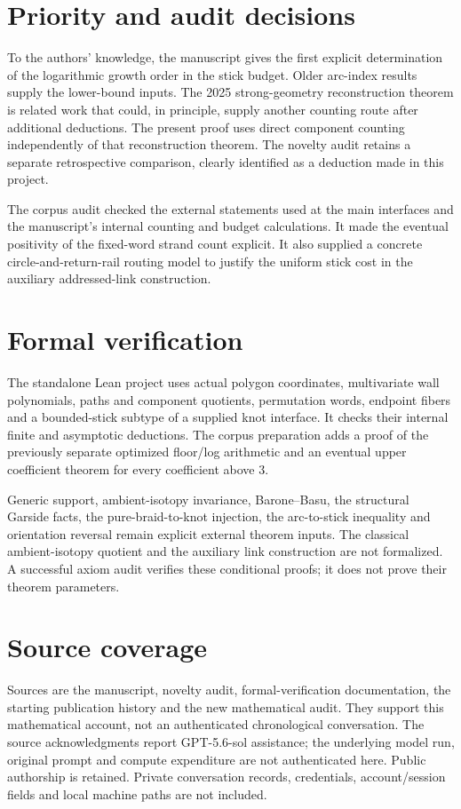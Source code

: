 \documentclass[11pt]{article}
\begin{document}
\section*{Priority and audit decisions}
To the authors' knowledge, the manuscript gives the first explicit
determination of the logarithmic growth order in the stick budget. Older
arc-index results supply the lower-bound inputs. The 2025 strong-geometry
reconstruction theorem is related work that could, in principle, supply
another counting route after additional deductions. The present proof uses
direct component counting independently of that reconstruction theorem.
The novelty audit retains a separate retrospective comparison, clearly
identified as a deduction made in this project.

The corpus audit checked the external statements used at the main interfaces
and the manuscript's internal counting and budget calculations. It made the
eventual positivity of the fixed-word strand count explicit. It also supplied
a concrete circle-and-return-rail routing model to justify the uniform stick
cost in the auxiliary addressed-link construction.

\section*{Formal verification}
The standalone Lean project uses actual polygon coordinates, multivariate
wall polynomials, paths and component quotients, permutation words, endpoint
fibers and a bounded-stick subtype of a supplied knot interface. It checks
their internal finite and asymptotic deductions. The corpus preparation adds
a proof of the previously separate optimized floor/log arithmetic and an
eventual upper coefficient theorem for every coefficient above 3.

Generic support, ambient-isotopy invariance, Barone--Basu, the structural
Garside facts, the pure-braid-to-knot injection, the arc-to-stick inequality
and orientation reversal remain explicit external theorem inputs. The
classical ambient-isotopy quotient and the auxiliary link construction are
not formalized. A successful axiom audit verifies these conditional proofs;
it does not prove their theorem parameters.

\section*{Source coverage}
Sources are the manuscript, novelty audit, formal-verification documentation,
the starting publication history and the new mathematical audit. They support
this mathematical account, not an authenticated chronological conversation.
The source acknowledgments report GPT-5.6-sol assistance; the underlying
model run, original prompt and compute expenditure are not authenticated here.
Public authorship is retained. Private conversation records, credentials,
account/session fields and local machine paths are not included.
\end{document}
